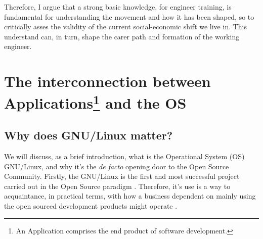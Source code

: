 \documentclass[
12pt,				%
openright,			%
oneside,			%
a4paper,			%
brazil,				%
english,			%
]{abntex2}
\begin{document}
Therefore, I argue that a strong basic
knowledge, for engineer training, is fundamental for understanding the
movement and how it has been shaped, so to critically asses the
validity of the current social-economic shift we live in. This
understand can, in turn, shape the carer path and formation of the
working engineer.

\section{The interconnection between Applications\footnote{An Application comprises the end product of software development.} and the OS}


\subsection{Why does GNU/Linux matter?}

We will discuss, as a brief introduction, what is the Operational System
(OS) GNU/Linux, and why it's the \textit{de facto} opening door to the
Open Source Community. Firstly, the GNU/Linux is the first and most
successful project carried out in the Open Source paradigm
\cite{tu2000evolution,west2001open}. Therefore, it's use is a way to
acquaintance, in practical terms, with how a business dependent on mainly
using the open sourced development products might operate \cite{fink2003business}.   
\end{document}
